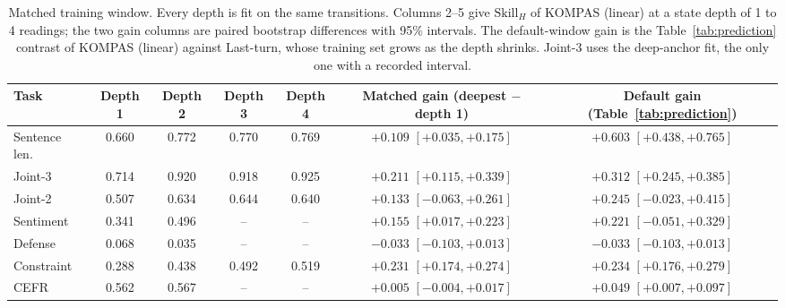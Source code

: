 \begin{table}[t]
\centering
\caption{Matched training window. Every depth is fit on the same transitions. Columns 2--5 give $\mathrm{Skill}_H$ of KOMPAS (linear) at a state depth of 1 to 4 readings; the two gain columns are paired bootstrap differences with 95\% intervals. The default-window gain is the Table~\ref{tab:prediction} contrast of KOMPAS (linear) against Last-turn, whose training set grows as the depth shrinks. Joint-3 uses the deep-anchor fit, the only one with a recorded interval.}
\label{tab:matched_window}
\scriptsize
\setlength{\tabcolsep}{3pt}
\begin{tabular}{lcccccc}
\toprule
Task & Depth 1 & Depth 2 & Depth 3 & Depth 4 & Matched gain (deepest $-$ depth 1) & Default gain (Table~\ref{tab:prediction}) \\
\midrule
Sentence len. & 0.660 & 0.772 & 0.770 & 0.769 & $+0.109$ $[+0.035, +0.175]$ & $+0.603$ $[+0.438, +0.765]$ \\  %
Joint-3 & 0.714 & 0.920 & 0.918 & 0.925 & $+0.211$ $[+0.115, +0.339]$ & $+0.312$ $[+0.245, +0.385]$ \\  %
Joint-2 & 0.507 & 0.634 & 0.644 & 0.640 & $+0.133$ $[-0.063, +0.261]$ & $+0.245$ $[-0.023, +0.415]$ \\  %
Sentiment & 0.341 & 0.496 & -- & -- & $+0.155$ $[+0.017, +0.223]$ & $+0.221$ $[-0.051, +0.329]$ \\  %
Defense & 0.068 & 0.035 & -- & -- & $-0.033$ $[-0.103, +0.013]$ & $-0.033$ $[-0.103, +0.013]$ \\  %
Constraint & 0.288 & 0.438 & 0.492 & 0.519 & $+0.231$ $[+0.174, +0.274]$ & $+0.234$ $[+0.176, +0.279]$ \\  %
CEFR & 0.562 & 0.567 & -- & -- & $+0.005$ $[-0.004, +0.017]$ & $+0.049$ $[+0.007, +0.097]$ \\  %
\bottomrule
\end{tabular}
\end{table}

